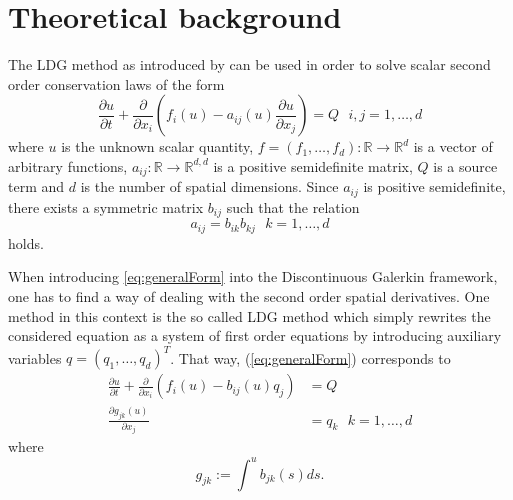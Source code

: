 \section{Theoretical background}
\label{sec:theoreticalBackground}

The LDG method as introduced by \cite{Cockburn1998} can be used in order to 
solve scalar second order conservation laws of the form
\begin{equation}
	\frac{\partial u}{\partial t}
	+ \frac{\partial}{\partial x_i} \left(
	  	f_i(u)
	  	- a_{ij}(u) \frac{\partial u}{\partial x_j}
	\right)
	= Q ~~~ i,j = 1,\ldots,d
\label{eq:generalForm}
\end{equation}
where $u$ is the unknown scalar quantity,
$f = (f_1, \ldots, f_d): \mathbb{R} \rightarrow \mathbb{R}^d$
is a vector of arbitrary functions,
$a_{ij}: \mathbb{R} \rightarrow \mathbb{R}^{d,d}$ is a positive semidefinite
matrix, $Q$ is a source term and $d$ is the number of spatial dimensions. Since
$a_{ij}$ is positive semidefinite, there exists a symmetric matrix $b_{ij}$
such that the relation
\begin{equation}
	a_{ij} = b_{ik} b_{kj} ~~~ k = 1,\ldots,d
\label{eq:decomposition}
\end{equation}
holds.

When introducing \ref{eq:generalForm} into the Discontinuous Galerkin
framework, one has to find a way of dealing with the second order spatial
derivatives. One method in this context is the so called LDG method which
simply rewrites the considered equation as a system of first order equations
by introducing auxiliary variables $q = (q_1, \ldots, q_d)^T$. That way,
(\ref{eq:generalForm}) corresponds to
\begin{align}
\label{eq:generalFirstOrderSystem_u}
	\frac{\partial u}{\partial t}
	+ \frac{\partial}{\partial x_i} \left(
		f_i(u)
		- b_{ij}(u) q_j
  \right)
  &= Q\\
\label{eq:generalFirstOrderSystem_q}
  \frac{\partial g_{jk}(u)}{\partial x_j}
  &= q_k ~~~ k = 1,\ldots,d
\end{align}
where
\begin{equation}
	g_{jk} := \int^u{b_{jk}(s) ds}.
\label{eq:definition_g}
\end{equation}

